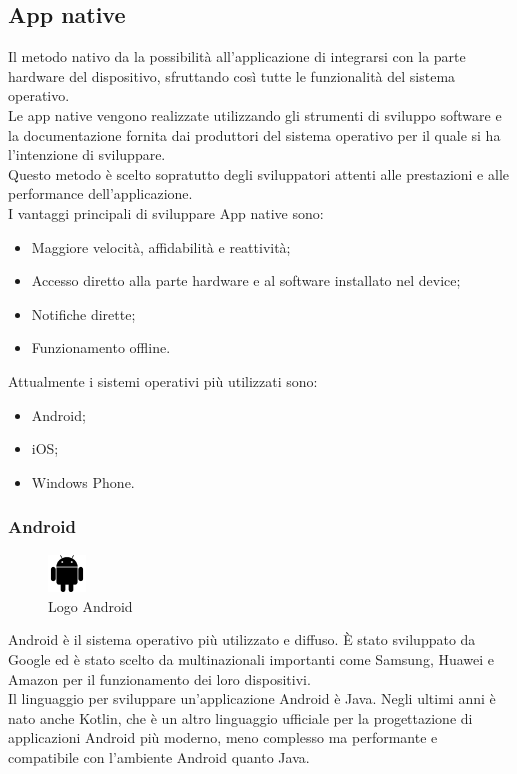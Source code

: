 \subsection{App native}
Il metodo nativo \cite{differenza,apptonative} da la possibilità all'applicazione di integrarsi con la parte hardware del dispositivo, sfruttando così tutte le funzionalità del sistema operativo. \\
Le app native vengono realizzate utilizzando gli strumenti di sviluppo software e la documentazione fornita dai produttori del sistema operativo per il quale si ha l'intenzione di sviluppare.\\
Questo metodo è scelto sopratutto degli sviluppatori attenti alle prestazioni e alle performance dell'applicazione.\\
I vantaggi principali di sviluppare App native sono:
\begin{itemize}
	\item Maggiore velocità, affidabilità e reattività;
	\item Accesso diretto alla parte hardware e al software installato nel device; 
	\item Notifiche dirette;
	\item Funzionamento offline.
\end{itemize}
Attualmente i sistemi operativi più utilizzati sono:
\begin{itemize}
	\item Android; 
	\item iOS; 
	\item Windows Phone.\\
\end{itemize}
\cite{sviluppo}

\subsubsection{Android}
\begin{figure}[htbp]	
	\centering
	\includegraphics[width=1cm]{immagini/logoandroid.png}
	\caption{Logo Android}
	\label{fig:Logo Android}
\end{figure}
 Android è il sistema operativo più utilizzato e diffuso. È stato sviluppato da Google ed è stato scelto da multinazionali importanti come Samsung, Huawei e Amazon per il funzionamento dei loro dispositivi.\\
 Il linguaggio per sviluppare un'applicazione Android è Java. Negli ultimi anni è nato anche Kotlin, che è un altro linguaggio ufficiale per la progettazione di applicazioni Android più moderno, meno complesso ma performante e compatibile con l'ambiente Android quanto Java.\\
 \newpage

